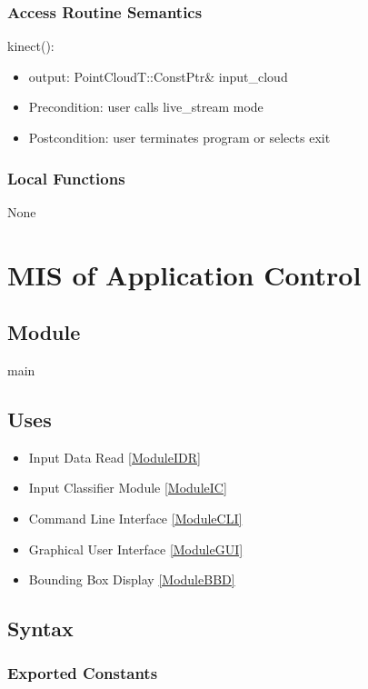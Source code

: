 \documentclass[12pt, titlepage]{article}
\begin{document}
\subsubsection{Access Routine Semantics}

\noindent kinect():
\begin{itemize}
  \item output: PointCloudT::ConstPtr\& input\_cloud
  \item Precondition: user calls live\_stream mode
  \item Postcondition: user terminates program or selects exit 
\end{itemize}

\subsubsection{Local Functions}

None

\newpage

\section{MIS of Application Control} \label{ModuleAC} 

\subsection{Module}

main

\subsection{Uses}

\begin{itemize}
  \item Input Data Read \ref{ModuleIDR}
  \item Input Classifier Module \ref{ModuleIC}
  \item Command Line Interface \ref{ModuleCLI}
  \item Graphical User Interface \ref{ModuleGUI}
  \item Bounding Box Display \ref{ModuleBBD}
\end{itemize}

\subsection{Syntax}

\subsubsection{Exported Constants}
\end{document}
